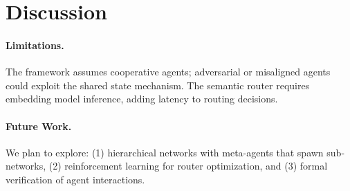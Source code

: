 \section{Discussion}


\paragraph{Limitations.} The framework assumes cooperative agents; adversarial or misaligned agents could exploit the shared state mechanism. The semantic router requires embedding model inference, adding latency to routing decisions.

\paragraph{Future Work.} We plan to explore: (1) hierarchical networks with meta-agents that spawn sub-networks, (2) reinforcement learning for router optimization, and (3) formal verification of agent interactions.

